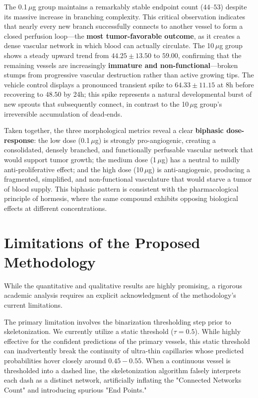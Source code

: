 The 0.1\,$\mu$g group maintains a remarkably stable endpoint count ($44$--$53$) despite its massive increase in branching complexity. This critical observation indicates that nearly every new branch successfully connects to another vessel to form a closed perfusion loop---the \textbf{most tumor-favorable outcome}, as it creates a dense vascular network in which blood can actually circulate. The 10\,$\mu$g group shows a steady upward trend from $44.25 \pm 13.50$ to $59.00$, confirming that the remaining vessels are increasingly \textbf{immature and non-functional}---broken stumps from progressive vascular destruction rather than active growing tips. The vehicle control displays a pronounced transient spike to $64.33 \pm 11.15$ at 8h before recovering to $48.50$ by 24h; this spike represents a natural developmental burst of new sprouts that subsequently connect, in contrast to the 10\,$\mu$g group's irreversible accumulation of dead-ends.

Taken together, the three morphological metrics reveal a clear \textbf{biphasic dose-response}: the low dose (0.1\,$\mu$g) is strongly pro-angiogenic, creating a consolidated, densely branched, and functionally perfusable vascular network that would support tumor growth; the medium dose (1\,$\mu$g) has a neutral to mildly anti-proliferative effect; and the high dose (10\,$\mu$g) is anti-angiogenic, producing a fragmented, simplified, and non-functional vasculature that would starve a tumor of blood supply. This biphasic pattern is consistent with the pharmacological principle of hormesis, where the same compound exhibits opposing biological effects at different concentrations.

\section{Limitations of the Proposed Methodology}
While the quantitative and qualitative results are highly promising, a rigorous academic analysis requires an explicit acknowledgment of the methodology's current limitations.

The primary limitation involves the binarization thresholding step prior to skeletonization. We currently utilize a static threshold ($\tau = 0.5$). While highly effective for the confident predictions of the primary vessels, this static threshold can inadvertently break the continuity of ultra-thin capillaries whose predicted probabilities hover closely around $0.45 - 0.55$. When a continuous vessel is thresholded into a dashed line, the skeletonization algorithm falsely interprets each dash as a distinct network, artificially inflating the "Connected Networks Count" and introducing spurious "End Points." 


